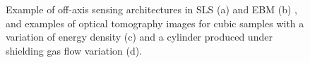 \begin{figure}
{    }
    \qquad
    \caption[Monitoring systems configurations and optical tomography examples.]{Example of off-axis sensing architectures in SLS (a) and EBM (b) \cite{colosimo_-machine_2020}, and examples of optical tomography images for cubic samples with a variation of energy density (c) and a cylinder produced under shielding gas flow variation (d)\cite{bamberg_-process_2016}.}
\end{figure}

